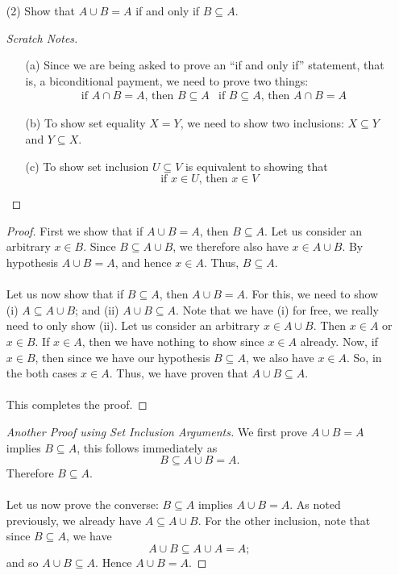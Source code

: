 \begin{example}
\begin{itemize}[itemsep=1.5em]
\item[(2)] Show that $A \cup B = A$ if and only if $B \subseteq A$.\\
\begin{subproof}
\begin{proof}[Scratch Notes]\hfill
\renewcommand{\qed}{}
\begin{itemize}
\item[(a)] Since we are being asked to prove an ``if and only if'' statement, that is, a biconditional payment, we need to prove two things:
\begin{align*}
&\text{if $A \cap B = A$, then $B \subseteq A$}
&\text{if $B \subseteq A$, then $A \cap B = A$}
\end{align*}
\item[(b)] To show set equality $X = Y$, we need to show two inclusions: $X \subseteq Y$ and $Y \subseteq X$. 
\item[(c)] To show set inclusion $U \subseteq V$ is equivalent to showing that
\[\text{if $x \in U$, then $x \in V$}\]
\end{itemize}
\end{proof}
\end{subproof}

\begin{proof}
First we show that if $A \cup B = A$, then $B \subseteq A$. Let us consider an arbitrary $x \in B$. Since $B \subseteq A \cup B$, we therefore also have $x \in A \cup B$. By hypothesis $A \cup B = A$, and hence $x \in A$. Thus, $B \subseteq A$. \\
\\
Let us now show that if $B \subseteq A$, then $A \cup B = A$. For this, we need to show (i) $A \subseteq A \cup B$; and (ii) $A \cup B \subseteq A$. Note that we have (i) for free, we really need to only show (ii). Let us consider an arbitrary $x \in A \cup B$. Then $x \in A$ or $x \in B$. If $x \in A$, then we have nothing to show since $x \in A$ already. Now, if $x \in B$, then since we have our hypothesis $B \subseteq A$, we also have $x \in A$. So, in the both cases $x \in A$. Thus, we have proven that $A \cup B \subseteq A$.\\
\\
This completes the proof. 
\end{proof}

\begin{proof}[Another Proof using Set Inclusion Arguments]
We first prove $A \cup B = A$ implies $B \subseteq A$, this follows immediately as
\[B \subseteq A\cup B = A.\]
Therefore $B \subseteq A$.\\
\\
Let us now prove the converse: $B \subseteq A$ implies $A \cup B = A$. As noted previously, we already have $A \subseteq A \cup B$. For the other inclusion, note that since $B \subseteq A$, we have
\[A \cup B \subseteq A \cup A = A;\]
and so $A \cup B \subseteq A$. Hence $A \cup B = A$.
\end{proof}
\end{itemize}
\end{example}

